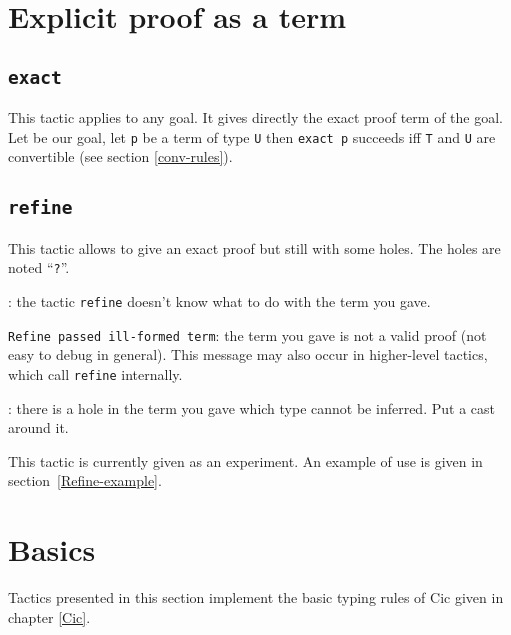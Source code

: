 \section{Explicit proof as a term}

\subsection{\tt exact \term}
\label{exact}
This tactic applies to any goal. It gives directly the exact proof
term of the goal. Let {\T} be our goal, let {\tt p} be a term of type
{\tt U} then {\tt exact p} succeeds iff {\tt T} and {\tt U} are
convertible (see section \ref{conv-rules}).

\begin{ErrMsgs}
\item {}
\end{ErrMsgs}


\subsection{\tt refine \term}
\label{Refine}

This tactic allows to give an exact proof but still with some
holes. The holes are noted ``\texttt{?}''.

\begin{ErrMsgs}
\item {}: 
  the tactic \texttt{refine} doesn't know what to do
  with the term you gave.
\item \texttt{Refine passed ill-formed term}: the term you gave is not
  a valid proof (not easy to debug in general).
  This message may also occur in higher-level tactics, which call 
  \texttt{refine} internally.
\item {}: 
  there is a hole in the term you gave
  which type cannot be inferred. Put a cast around it.
\end{ErrMsgs}

This tactic is currently given as an experiment. An example of use is given
in section~\ref{Refine-example}.

\section{Basics}
Tactics presented in this section implement the basic typing rules of
{\sc Cic} given in chapter \ref{Cic}.

